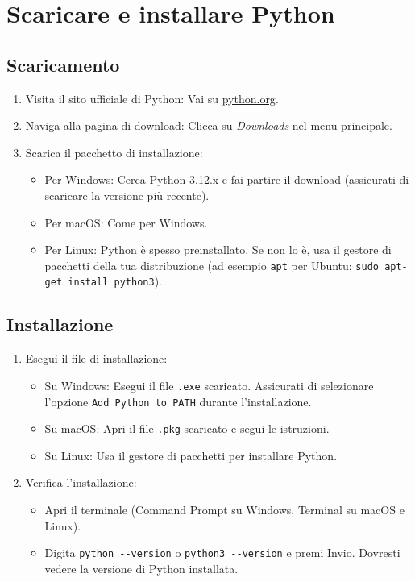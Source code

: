 \documentclass[
  letterpaper,
]{scrbook}
\begin{document}
\chapter{Scaricare e installare
Python}\label{scaricare-e-installare-python}

\section{Scaricamento}\label{scaricamento}

\begin{enumerate}
\def\labelenumi{\arabic{enumi}.}
\item
  Visita il sito ufficiale di Python: Vai su
  \href{https://www.python.org/}{python.org}.
\item
  Naviga alla pagina di download: Clicca su \emph{Downloads} nel menu
  principale.
\item
  Scarica il pacchetto di installazione:

  \begin{itemize}
  \item
    Per Windows: Cerca Python 3.12.x e fai partire il download
    (assicurati di scaricare la versione più recente).
  \item
    Per macOS: Come per Windows.
  \item
    Per Linux: Python è spesso preinstallato. Se non lo è, usa il
    gestore di pacchetti della tua distribuzione (ad esempio
    \texttt{apt} per Ubuntu: \texttt{sudo\ apt-get\ install\ python3}).
  \end{itemize}
\end{enumerate}

\section{Installazione}\label{installazione}

\begin{enumerate}
\def\labelenumi{\arabic{enumi}.}
\item
  Esegui il file di installazione:

  \begin{itemize}
  \item
    Su Windows: Esegui il file \texttt{.exe} scaricato. Assicurati di
    selezionare l'opzione \texttt{Add\ Python\ to\ PATH} durante
    l'installazione.
  \item
    Su macOS: Apri il file \texttt{.pkg} scaricato e segui le
    istruzioni.
  \item
    Su Linux: Usa il gestore di pacchetti per installare Python.
  \end{itemize}
\item
  Verifica l'installazione:

  \begin{itemize}
  \item
    Apri il terminale (Command Prompt su Windows, Terminal su macOS e
    Linux).
  \item
    Digita \texttt{python\ -\/-version} o \texttt{python3\ -\/-version}
    e premi Invio. Dovresti vedere la versione di Python installata.
  \end{itemize}
\end{enumerate}
\end{document}
